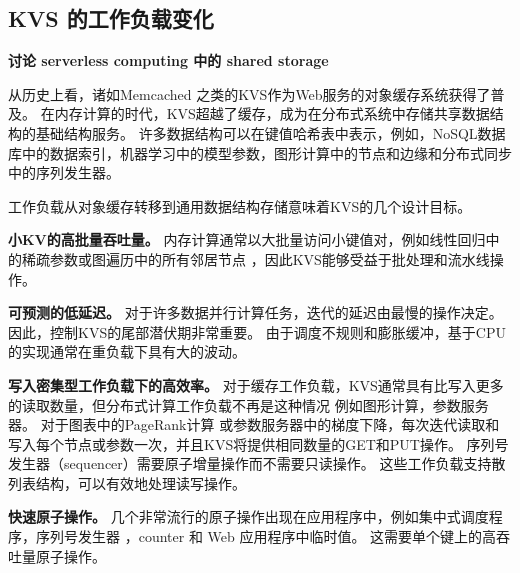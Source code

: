 \subsection{KVS 的工作负载变化}
\label{kvdirect:sec:workload-shift}

\textbf{讨论 serverless computing 中的 shared storage}

从历史上看，诸如Memcached \cite {fitzpatrick2004distributed}之类的KVS作为Web服务的对象缓存系统获得了普及。
在内存计算的时代，KVS超越了缓存，成为在分布式系统中存储共享数据结构的基础结构服务。
许多数据结构可以在键值哈希表中表示，例如，NoSQL数据库中的数据索引\cite {chang2008bigtable}，机器学习中的模型参数\cite {li2014scaling}，图形计算中的节点和边缘\cite {shao2013trinity,xiao17tux2}和分布式同步中的序列发生器\cite {kalia2016design,eris}。

工作负载从对象缓存转移到通用数据结构存储意味着KVS的几个设计目标。

\textbf {小KV的高批量吞吐量。}
内存计算通常以大批量访问小键值对，例如线性回归中的稀疏参数\cite {li2014algorithmic,xiao17tux2}或图遍历中的所有邻居节点 \cite {shao2013trinity}，因此KVS能够受益于批处理和流水线操作。

\textbf {可预测的低延迟。}
对于许多数据并行计算任务，迭代的延迟由最慢的操作决定\cite {ousterhout2015ramcloud}。 因此，控制KVS的尾部潜伏期非常重要。 由于调度不规则和膨胀缓冲，基于CPU的实现通常在重负载下具有大的波动。

\textbf {写入密集型工作负载下的高效率。}
对于缓存工作负载，KVS通常具有比写入更多的读取数量\cite {atikoglu2012workload}，但分布式计算工作负载不再是这种情况
例如图形计算\cite {page1999pagerank}，参数服务器\cite {li2014scaling}。
对于图表中的PageRank计算\cite {page1999pagerank} 或参数服务器中的梯度下降\cite {li2014scaling}，每次迭代读取和写入每个节点或参数一次，并且KVS将提供相同数量的GET和PUT操作。
序列号发生器（sequencer）\cite {kalia2016design}需要原子增量操作而不需要只读操作。
这些工作负载支持散列表结构，可以有效地处理读写操作。

\textbf {快速原子操作。}
几个非常流行的原子操作出现在应用程序中，例如集中式调度程序\cite {perry2014fastpass}，序列号发生器 \cite {kalia2016design,eris}，counter \cite {zhu2015packet}和 Web 应用程序中临时值\cite {atikoglu2012workload}。
这需要单个键上的高吞吐量原子操作。

